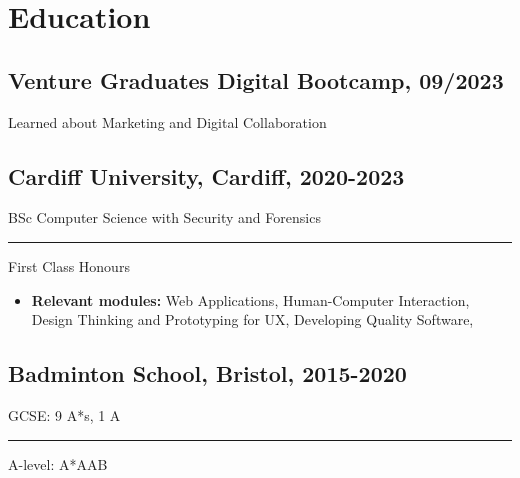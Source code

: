 \documentclass[11pt]{article}
\newcommand{\verticalline}[1][1pt]{\rule[-0.35ex]{#1}{0.9em}}
\begin{document}
    \section{Education}
    \subsection{Venture Graduates Digital Bootcamp, 09/2023}Learned about Marketing and Digital Collaboration 
    \subsection{Cardiff University, Cardiff, 2020-2023} 
    BSc Computer Science with Security and Forensics  \verticalline{} First Class Honours
    \begin{itemize}[itemsep=0pt, leftmargin=1em,topsep=-\parskip]
        \item \textbf{Relevant modules:} Web Applications, Human-Computer Interaction, Design Thinking and Prototyping for UX, Developing Quality Software,
    \end{itemize}
    \subsection{Badminton School, Bristol, 2015-2020}
    GCSE: 9 A*s, 1 A \verticalline{} A-level: A*AAB
\end{document}
